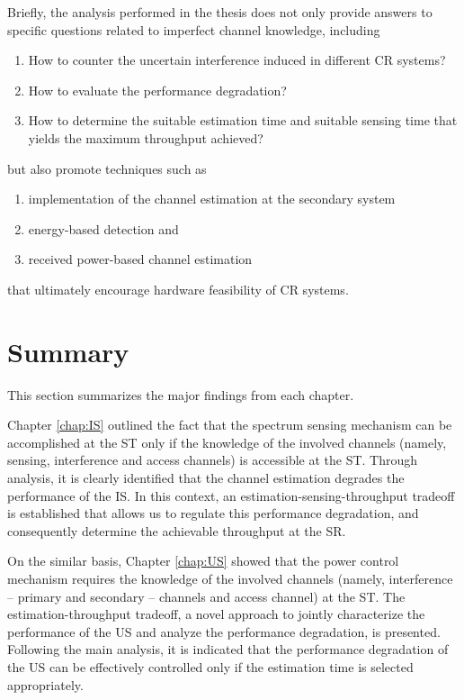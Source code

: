Briefly, the analysis performed in the thesis does not only provide answers to specific questions related to imperfect channel knowledge, including 
\begin{enumerate} \item How to counter the uncertain interference induced in different CR systems? \item How to evaluate the performance degradation? \item How to determine the suitable estimation time and suitable sensing time that yields the maximum throughput achieved? \end{enumerate}
but also promote techniques such as \begin{enumerate} \item implementation of the channel estimation at the secondary system \item energy-based detection and \item received power-based channel estimation \end{enumerate} that ultimately encourage hardware feasibility of CR systems. 


\section{Summary}
This section summarizes the major findings from each chapter. 

Chapter \ref{chap:IS} outlined the fact that the spectrum sensing mechanism can be accomplished at the ST only if the knowledge of the involved channels (namely, sensing, interference and access channels) is accessible at the ST. Through analysis, it is clearly identified that the channel estimation degrades the performance of the IS. In this context, an estimation-sensing-throughput tradeoff is established that allows us to regulate this performance degradation, and consequently determine the achievable throughput at the SR.

On the similar basis, Chapter \ref{chap:US} showed that the power control mechanism requires the knowledge of the involved channels (namely, interference -- primary and secondary -- channels and access channel) at the ST. The estimation-throughput tradeoff, a novel approach to jointly characterize the performance of the US and analyze the performance degradation, is presented. Following the main analysis, it is indicated that the performance degradation of the US can be effectively controlled only if the estimation time is selected appropriately.   

